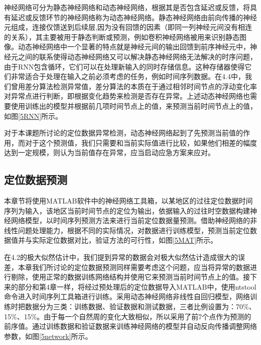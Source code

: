 \documentclass[a4paper,AutoFakeBold,oneside,12pt]{book}
\begin{document}
	神经网络可分为静态神经网络和动态神经网络，根据其是否包含延迟或反馈，将具有延迟或反馈环节的神经网络称为动态神经网络。静态神经网络由前向传播的神经元组成，连接仅馈送到后续层,因为没有回馈的因素（即同一列神经元间没有相连的关系），其主要被用于静态判断或预测，例如卷积神经网络被用来识别静态图像。动态神经网络中一个显著的特点就是神经元间的输出回馈到前序神经元中，神经元之间的联系使得动态神经网络又可以解决静态神经网络无法解决的时序问题，由于RNN包含循环，它们可以在处理新输入的同时存储信息。这种存储器使得它们非常适合于处理在输入之前必须考虑的任务，例如时间序列数据。在4.4中，我们曾用差分算法检测异常值，差分算法的本质在于通过相邻时间节点的浮动变化率对异常点进行判断，即根据变化趋势来检测是否存在异常。上述动态神经网络也需要使用训练出的模型并根据前几项时间节点上的值，来预测当前时间节点上的值，如图\ref{5RNN}所示。


	对于本课题所讨论的定位数据异常检测，动态神经网络起到了先预测当前值的作用，而对于这个预测值，我们只需要和当前实际值进行比较，如果他们相差的幅度达到一定规模，则认为当前值存在异常，应当启动应急方案来应对。

\subsection{定位数据预测}
	本章节将使用MATLAB软件中的神经网络工具箱，以某地区的过往定位数据时间序列为输入，该地区当前时间节点的定位为输出，依据输入的过往时空数据构建神经网络模型，以时间序列预测方法来进行当前定位数据量预测。借助神经网络的非线性问题处理能力，根据不同的实际情况，对数据进行训练模型，预测当前定位数据值并与实际定位数据对比，验证方法的可行性，如图\ref{5MAT}所示。


	在4.2的极大似然估计中，我们提到异常的数据会对极大似然估计造成很大的误差，本章我们所讨论的定位数据预测同样需要考虑这个问题，应当将异常的数据进行剔除，使用正常的数据训练网络结构并使用它来预测当前时间节点上的值。接下来的部分和第4章一样，将经过预处理后的定位数据导入MATLAB中，使用ntstool命令进入时间序列工具箱进行训练。采用动态神经网络非线性自回归模型，网络训练时把数据分为三类：训练数据、验证数据和测试数据，三者比例设置为：70\%、15\%、15\%。由于每一个自然周的变化大致相似，所以采用了前7个点作为预测的前序值。通过训练数据和验证数据来训练神经网络的模型并自动反向传播调整网络参数，如图\ref{5network}所示。

\end{document}
